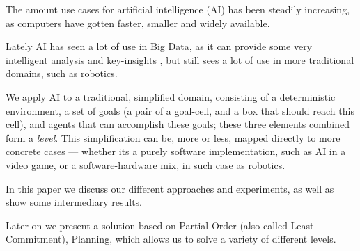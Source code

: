 \documentclass[Main]{subfiles}
\begin{document}
The amount use cases for artificial intelligence (AI) has been steadily increasing, as computers have gotten faster, smaller and widely available.\citep{barrons2013}\citep{poynter2014}\citep{sabhnaniai}

Lately AI has seen a lot of use in Big Data, as it can provide some very intelligent analysis and key-insights \citep{OLeary2013},
but still sees a lot of use in more traditional domains, such as robotics.

We apply AI to a traditional, simplified domain, consisting of a deterministic environment, a set of goals (a pair of a goal-cell, and a box that should reach this cell), and agents that can accomplish these goals; these three elements combined form a \textit{level}.
This simplification can be, more or less, mapped directly to more concrete cases --- 
whether its a purely software implementation, such as AI in a video game, or a software-hardware mix, in such case as robotics.

In this paper we discuss our different approaches and experiments, as well as show some intermediary results.

Later on we present a solution based on Partial Order (also called Least Commitment), Planning, 
which allows us to solve a variety of different levels. 
\end{document}
